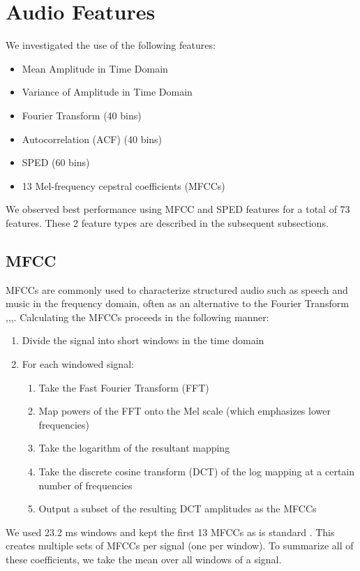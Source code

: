 \documentclass[journal]{IEEEtran}
\begin{document}
\section{Audio Features}
We investigated the use of the following features:
\begin{itemize}
\item Mean Amplitude in Time Domain
\item Variance of Amplitude in Time Domain
\item Fourier Transform (40 bins)
\item Autocorrelation (ACF) (40 bins)
\item SPED (60 bins)
\item 13 Mel-frequency cepstral coefficients (MFCCs)
\end{itemize}
We observed best performance using MFCC and SPED features for a total of 73 features. These 2 feature types are described in the subsequent subsections.

\subsection{MFCC}
MFCCs are commonly used to characterize structured audio such as speech and music in the frequency domain, often as an alternative to the Fourier Transform \cite{Chu},\cite{Chu2Env},\cite{guo2003content},\cite{aucouturier2007bag}. Calculating the MFCCs proceeds in the following manner\cite{rabiner1993fundamentals}:
\begin{enumerate}
\item Divide the signal into short windows in the time domain
\item For each windowed signal:
    \begin{enumerate}
    \item Take the Fast Fourier Transform (FFT)
    \item Map powers of the FFT onto the Mel scale (which emphasizes lower frequencies)
    \item Take the logarithm of the resultant mapping
    \item Take the discrete cosine transform (DCT) of the log mapping at a certain number of frequencies
    \item Output a subset of the resulting DCT amplitudes as the MFCCs
    \end{enumerate}
\end{enumerate} 
We used 23.2 ms windows and kept the first 13 MFCCs as is standard \cite{Chu2Env}. This creates multiple sets of MFCCs per signal (one per window). To summarize all of these coefficients, we take the mean over all windows of a signal.
\end{document}
